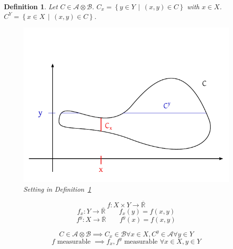 \documentclass[a4paper]{article}
\newcounter{lecref}[section]
\numberwithin{lecref}{section}
\theoremstyle{break}
\newtheorem{definition}[lecref]{Definition}
\newcommand{\SetDef}[2]{\left\{#1\,\mid\,#2\right\}}
\begin{document}
\begin{definition}
  \label{def:fub}
  Let $C \in \mathcal A \otimes \mathcal B$. $C_x = \SetDef{y \in Y}{(x, y) \in C}$ with $x \in X$.
  $C^Y = \SetDef{x \in X}{(x, y) \in C}$.

  \begin{figure}[!ht]
    \begin{center}
      \includegraphics{img/fubini_theorem.pdf}
      \caption{Setting in Definition~\ref{def:fub}}
      \label{img:fubini}
    \end{center}
  \end{figure}

  \[ f: X \times Y \to \overline{\mathbb R} \]
  \[ f_x: Y \to \overline{\mathbb R} \qquad f_x(y) = f(x, y) \]
  \[ f^y: X \to \overline{\mathbb R} \qquad f^y(x) = f(x, y) \]
\end{definition}

\begin{theorem}
  \[ C \in \mathcal A \otimes \mathcal B \implies C_x \in \mathcal B \forall x \in X, C^y \in \mathcal A \forall y \in Y \]
  \[ f \text{ measurable } \implies f_x, f^y \text{ measurable } \forall x \in X, y \in Y \]
\end{theorem}
\end{document}
